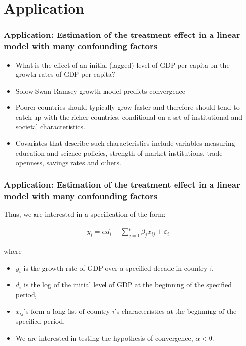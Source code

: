 \documentclass[
  shownotes,
  xcolor={svgnames},
  hyperref={colorlinks,citecolor=DarkBlue,linkcolor=DarkRed,urlcolor=DarkBlue}
  , aspectratio=169]{beamer}
\begin{document}
\section{Application}
\begin{frame}[fragile]
\frametitle{Application: Estimation of the treatment effect in a linear model with many confounding factors}

\begin{itemize}
\item What is the effect of an initial (lagged) level of GDP per capita on the growth rates of GDP per capita?
\medskip
\item Solow-Swan-Ramsey growth model predicts convergence
\medskip
\item Poorer countries should typically grow faster and therefore should tend to catch up with the richer countries, conditional on a set of institutional and societal characteristics. 
\medskip
\item Covariates that describe such characteristics include variables measuring education and science policies, strength of market institutions, trade openness, savings rates and others.
\end{itemize}

\end{frame}
\begin{frame}[fragile]
\frametitle{Application: Estimation of the treatment effect in a linear model with many confounding factors}


Thus, we are interested in a specification of the form:

\begin{align}
y_i = \alpha d_i+ \sum_{j=1}^p \beta_j x_{ij} + \varepsilon_i
\end{align}

where
\begin{itemize}
\item  \(y_i\) is the growth rate of GDP over a specified decade in country \(i\), 
\item \(d_i\) is the log of the initial level of GDP at the beginning of the specified period, 
\item \(x_{ij}\)'s form a long list of country \(i\)'s characteristics at the beginning of the specified period. 
\item We are interested in testing the hypothesis of convergence,  \(\alpha < 0\).
\end{itemize}


 

\end{frame}
\end{document}

